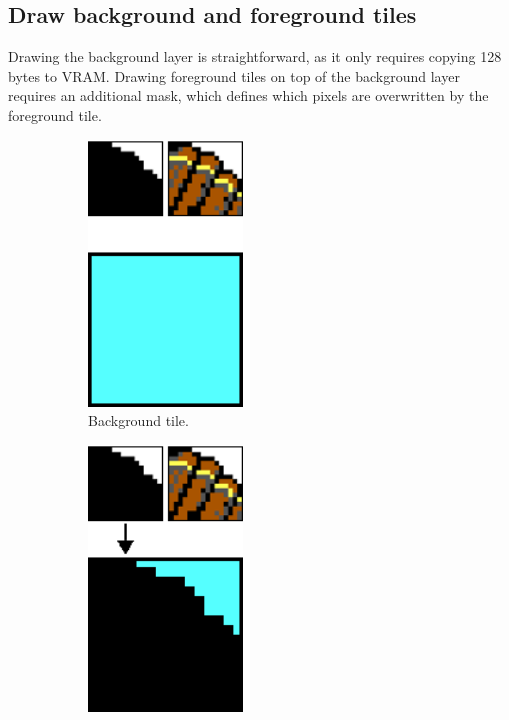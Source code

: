 \documentclass[book.tex]{subfiles}
\begin{document}
\subsection{Draw background and foreground tiles}
Drawing the background layer is straightforward, as it only requires copying 128 bytes to VRAM. Drawing foreground tiles on top of the background layer requires an additional mask, which defines which pixels are overwritten by the foreground tile.\\

\begin{figure}[H]
\centering
 \begin{subfigure}{0.32\textwidth}
 	\centering
 	\includegraphics[width=0.45\textwidth]{screenshots_300dpi/game/mask_tiles_1.png}
 	\caption{Background tile.}
 \end{subfigure}
 \begin{subfigure}{0.32\textwidth}
 	\centering
 	\includegraphics[width=0.45\textwidth]{screenshots_300dpi/game/mask_tiles_2.png}

\end{subfigure}
\end{figure}
\end{document}
